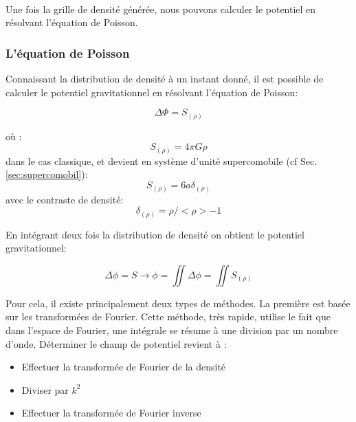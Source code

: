 \paragraph{}
Une fois la grille de densité générée, nous pouvons calculer le potentiel en résolvant l'équation de Poisson.

\subsubsection{L'équation de Poisson}

Connaissant la distribution de densité à un instant donné, il est possible de calculer le potentiel gravitationnel en résolvant l'équation de Poisson:

\begin{equation}
\Delta \Phi = S_{(\rho)}
\end{equation}

où :
\begin{equation}
S_{(\rho)} = 4 \pi G \rho
\end{equation}
dans le cas classique, et devient en système d'unité supercomobile (cf Sec. \ref{sec:supercomobil}):
\begin{equation}
S_{(\rho)} = 6 a \delta_{(\rho)}
\end{equation}
avec le contraste de densité: 
\begin{equation}
\delta_{(\rho)} = \rho / < \rho > - 1 
\end{equation}

En intégrant deux fois la distribution de densité on obtient le potentiel gravitationnel:

\begin{equation}
\Delta \phi = S \longrightarrow \phi = \iint \Delta \phi = \iint S_{(\rho)}
\end{equation}

Pour cela, il existe principalement deux types de méthodes. 
La première est basée sur les transformées de Fourier. 
Cette méthode, très rapide, utilise le fait que dans l'espace de Fourier, une intégrale se résume à une division par un nombre d'onde. 
Déterminer le champ de potentiel revient à : 
\begin{itemize}
\item Effectuer la transformée de Fourier de la densité
\item Diviser par $k^2$
\item Effectuer la transformée de Fourier inverse
\end{itemize}

